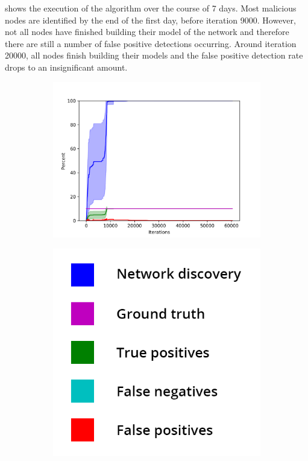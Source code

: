  shows the execution of the algorithm over the course of 7 days.
Most malicious nodes are identified by the end of the first day, before iteration 9000.
However, not all nodes have finished building their model of the network and therefore there are still a number of false positive detections occurring.
Around iteration 20000, all nodes finish building their models and the false positive detection rate drops to an insignificant amount.

\begin{figure}

\begin{subfigure}{0.5\textwidth}
\includegraphics[width=\textwidth]{images/plots/Network_rA7/10_10}
\end{subfigure}
\hspace*{\fill} %
\begin{subfigure}{0.3\textwidth}
\includegraphics[width=\linewidth]{images/legend2.png}
\end{subfigure}


\end{figure}
